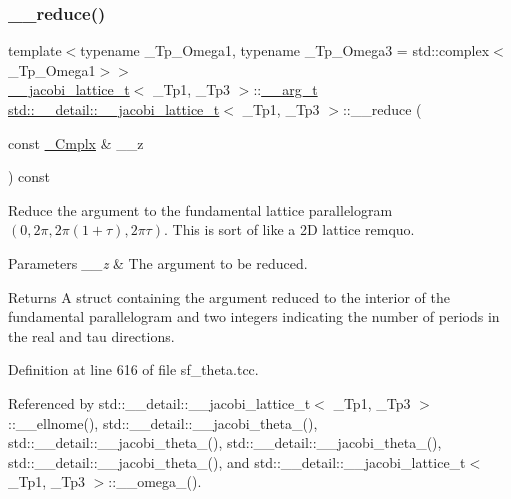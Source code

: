 \subsubsection{\texorpdfstring{\+\_\+\+\_\+reduce()}{\_\_reduce()}}
{\footnotesize\ttfamily template$<$typename \+\_\+\+Tp\+\_\+\+Omega1, typename \+\_\+\+Tp\+\_\+\+Omega3 = std\+::complex$<$\+\_\+\+Tp\+\_\+\+Omega1$>$$>$ \\
\hyperlink{structstd_1_1____detail_1_1____jacobi__lattice__t}{\+\_\+\+\_\+jacobi\+\_\+lattice\+\_\+t}$<$ \+\_\+\+Tp1, \+\_\+\+Tp3 $>$\+::\hyperlink{structstd_1_1____detail_1_1____jacobi__lattice__t_1_1____arg__t}{\+\_\+\+\_\+arg\+\_\+t} \hyperlink{structstd_1_1____detail_1_1____jacobi__lattice__t}{std\+::\+\_\+\+\_\+detail\+::\+\_\+\+\_\+jacobi\+\_\+lattice\+\_\+t}$<$ \+\_\+\+Tp1, \+\_\+\+Tp3 $>$\+::\+\_\+\+\_\+reduce (\begin{DoxyParamCaption}\item[{const \hyperlink{structstd_1_1____detail_1_1____jacobi__lattice__t_a77e286c37544d6ba5e4fb5542d3aad5f}{\+\_\+\+Cmplx} \&}]{\+\_\+\+\_\+z }\end{DoxyParamCaption}) const}

Reduce the argument to the fundamental lattice parallelogram $ (0, 2\pi, 2\pi (1 + \tau), 2\pi \tau) $. This is sort of like a 2D lattice remquo.


\begin{DoxyParams}{Parameters}
{\em \+\_\+\+\_\+z} & The argument to be reduced. \\
\hline
\end{DoxyParams}
\begin{DoxyReturn}{Returns}
A struct containing the argument reduced to the interior of the fundamental parallelogram and two integers indicating the number of periods in the \textquotesingle{}real\textquotesingle{} and \textquotesingle{}tau\textquotesingle{} directions. 
\end{DoxyReturn}


Definition at line 616 of file sf\+\_\+theta.\+tcc.



Referenced by std\+::\+\_\+\+\_\+detail\+::\+\_\+\+\_\+jacobi\+\_\+lattice\+\_\+t$<$ \+\_\+\+Tp1, \+\_\+\+Tp3 $>$\+::\+\_\+\+\_\+ellnome(), std\+::\+\_\+\+\_\+detail\+::\+\_\+\+\_\+jacobi\+\_\+theta\+\_(), std\+::\+\_\+\+\_\+detail\+::\+\_\+\+\_\+jacobi\+\_\+theta\+\_(), std\+::\+\_\+\+\_\+detail\+::\+\_\+\+\_\+jacobi\+\_\+theta\+\_(), std\+::\+\_\+\+\_\+detail\+::\+\_\+\+\_\+jacobi\+\_\+theta\+\_(), and std\+::\+\_\+\+\_\+detail\+::\+\_\+\+\_\+jacobi\+\_\+lattice\+\_\+t$<$ \+\_\+\+Tp1, \+\_\+\+Tp3 $>$\+::\+\_\+\+\_\+omega\+\_().

